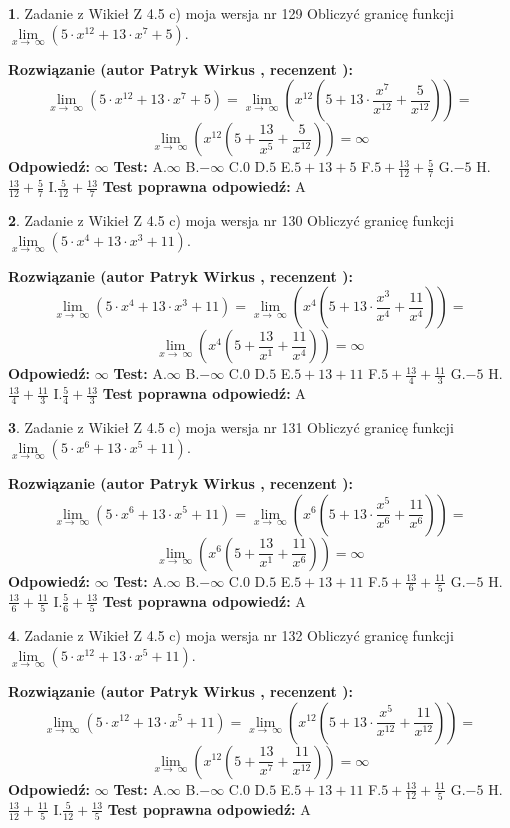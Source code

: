 \documentclass[12pt, a4paper]{article}
\theoremstyle{definition} %
\newtheorem{zad}{}
\newcommand{\zadStart}[1]{\begin{zad}#1\newline}
\newcommand{\zadStop}{\end{zad}}
\newcommand{\rozwStart}[2]{\noindent \textbf{Rozwiązanie (autor #1 , recenzent #2): }\newline}
\newcommand{\rozwStop}{\newline}
\newcommand{\odpStart}{\noindent \textbf{Odpowiedź:}\newline}
\newcommand{\odpStop}{\newline}
\newcommand{\testStart}{\noindent \textbf{Test:}\newline}
\newcommand{\testStop}{\newline}
\newcommand{\kluczStart}{\noindent \textbf{Test poprawna odpowiedź:}\newline}
\newcommand{\kluczStop}{\newline}
\begin{document}
\zadStart{Zadanie z Wikieł Z 4.5 c) moja wersja nr 129}
Obliczyć granicę funkcji  $\lim\limits_{x\to\ \infty}(5 \cdot x^{12}+13 \cdot x^{7}+5)$.
\zadStop
\rozwStart{Patryk Wirkus}{}
$$\lim\limits_{x\to\ \infty}(5 \cdot x^{12}+13 \cdot x^{7}+5) = \lim\limits_{x\to\ \infty}(x^{12}(5 +13 \cdot \frac{x^{7}}{x^{12}}+\frac{5}{x^{12}})) =$$ $$\lim\limits_{x\to\ \infty}(x^{12}(5 +\frac{13}{x^{5}}+\frac{5}{x^{12}})) =\infty$$
\rozwStop
\odpStart
$\infty$
\odpStop
\testStart
A.$\infty$ B.$-\infty$ C.$0$ D.$5$ E.$5 + 13 + 5$
F.$5+\frac{13}{12}+\frac{5}{7}$ G.$-5$
H.$\frac{13}{12}+\frac{5}{7}$
I.$\frac{5}{12}+\frac{13}{7}$
\testStop
\kluczStart
A
\kluczStop



\zadStart{Zadanie z Wikieł Z 4.5 c) moja wersja nr 130}
Obliczyć granicę funkcji  $\lim\limits_{x\to\ \infty}(5 \cdot x^{4}+13 \cdot x^{3}+11)$.
\zadStop
\rozwStart{Patryk Wirkus}{}
$$\lim\limits_{x\to\ \infty}(5 \cdot x^{4}+13 \cdot x^{3}+11) = \lim\limits_{x\to\ \infty}(x^{4}(5 +13 \cdot \frac{x^{3}}{x^{4}}+\frac{11}{x^{4}})) =$$ $$\lim\limits_{x\to\ \infty}(x^{4}(5 +\frac{13}{x^{1}}+\frac{11}{x^{4}})) =\infty$$
\rozwStop
\odpStart
$\infty$
\odpStop
\testStart
A.$\infty$ B.$-\infty$ C.$0$ D.$5$ E.$5 + 13 + 11$
F.$5+\frac{13}{4}+\frac{11}{3}$ G.$-5$
H.$\frac{13}{4}+\frac{11}{3}$
I.$\frac{5}{4}+\frac{13}{3}$
\testStop
\kluczStart
A
\kluczStop



\zadStart{Zadanie z Wikieł Z 4.5 c) moja wersja nr 131}
Obliczyć granicę funkcji  $\lim\limits_{x\to\ \infty}(5 \cdot x^{6}+13 \cdot x^{5}+11)$.
\zadStop
\rozwStart{Patryk Wirkus}{}
$$\lim\limits_{x\to\ \infty}(5 \cdot x^{6}+13 \cdot x^{5}+11) = \lim\limits_{x\to\ \infty}(x^{6}(5 +13 \cdot \frac{x^{5}}{x^{6}}+\frac{11}{x^{6}})) =$$ $$\lim\limits_{x\to\ \infty}(x^{6}(5 +\frac{13}{x^{1}}+\frac{11}{x^{6}})) =\infty$$
\rozwStop
\odpStart
$\infty$
\odpStop
\testStart
A.$\infty$ B.$-\infty$ C.$0$ D.$5$ E.$5 + 13 + 11$
F.$5+\frac{13}{6}+\frac{11}{5}$ G.$-5$
H.$\frac{13}{6}+\frac{11}{5}$
I.$\frac{5}{6}+\frac{13}{5}$
\testStop
\kluczStart
A
\kluczStop



\zadStart{Zadanie z Wikieł Z 4.5 c) moja wersja nr 132}
Obliczyć granicę funkcji  $\lim\limits_{x\to\ \infty}(5 \cdot x^{12}+13 \cdot x^{5}+11)$.
\zadStop
\rozwStart{Patryk Wirkus}{}
$$\lim\limits_{x\to\ \infty}(5 \cdot x^{12}+13 \cdot x^{5}+11) = \lim\limits_{x\to\ \infty}(x^{12}(5 +13 \cdot \frac{x^{5}}{x^{12}}+\frac{11}{x^{12}})) =$$ $$\lim\limits_{x\to\ \infty}(x^{12}(5 +\frac{13}{x^{7}}+\frac{11}{x^{12}})) =\infty$$
\rozwStop
\odpStart
$\infty$
\odpStop
\testStart
A.$\infty$ B.$-\infty$ C.$0$ D.$5$ E.$5 + 13 + 11$
F.$5+\frac{13}{12}+\frac{11}{5}$ G.$-5$
H.$\frac{13}{12}+\frac{11}{5}$
I.$\frac{5}{12}+\frac{13}{5}$
\testStop
\kluczStart
A
\kluczStop
\end{document}
